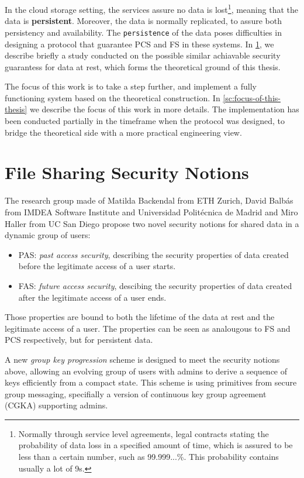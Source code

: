 In the cloud storage setting, the services assure no data is lost\footnote{Normally through service level agreements, legal contracts stating the probability of data loss in a specified amount of time, which is assured to be less than a certain number, such as 99.999...\%. This probability contains usually a lot of 9s.},
meaning that the data is \textbf{persistent}. 
Moreover, the data is normally replicated, to assure both persistency and availability.
The \texttt{persistence} of the data poses difficulties in designing a protocol that guarantee PCS and FS in these systems.
In \cref{sc:file-sharing-security-notions}, we describe briefly a study conducted on the possible similar achiavable security guarantess for data at rest, which forms the theoretical ground of this thesis.

The focus of this work is to take a step further, and implement a fully functioning system based on the theoretical construction.
In \cref{sc:focus-of-this-thesis} we describe the focus of this work in more details.
The implementation has been conducted partially in the timeframe when the protocol was designed, to bridge the theoretical side with a more practical engineering view.


\section{File Sharing Security Notions}\label{sc:file-sharing-security-notions}

The research group made of Matilda Backendal from ETH Zurich,
David Balb{\'a}s from IMDEA Software Institute and Universidad Polit{\'e}cnica de Madrid 
and Miro Haller from UC San Diego propose two novel security notions for shared data in
a dynamic group of users: 
\begin{itemize}
    \item PAS: \textit{past access security}, describing the security properties of data created before the legitimate access of a user starts.
    \item FAS: \textit{future access security}, descibing the security properties of data created after the legitimate access of a user ends.
\end{itemize}
Those properties are bound to both the lifetime of the data at rest and the legitimate access of a user.
The properties can be seen as analougous to FS and PCS respectively, but for persistent data.

A new \textit{group key progression} scheme is designed to meet the security notions above,
allowing an evolving group of users with admins to derive a sequence of keys efficiently from a compact state. 
This scheme is using primitives from secure group messaging, 
specifially a version of continuous key group agreement (CGKA) supporting admins.\cite{USENIX:BalColVau23}


